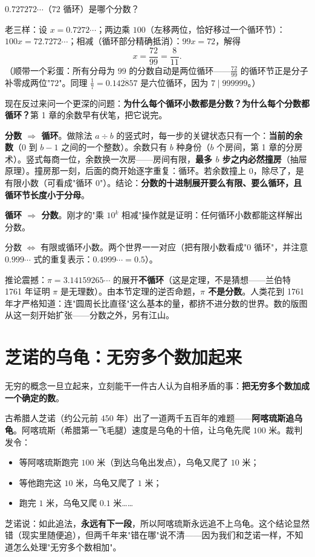 \begin{kaiwei}
$0.727272\cdots$（$72$ 循环）是哪个分数？
\end{kaiwei}

老三样：设 $x = 0.7272\cdots$；两边乘 $100$（左移两位，恰好移过一个循环节）：$100x = 72.7272\cdots$；相减（循环部分精确抵消）：$99x = 72$，解得
\[
x = \frac{72}{99} = \frac{8}{11} .
\]
（顺带一个彩蛋：所有分母为 $99$ 的分数自动是两位循环——$\tfrac{72}{99}$ 的循环节正是分子补零成两位"$72$"。同理 $\tfrac1{7} = 0.\overline{142857}$ 是六位循环，因为 $7 \mid 999999$。）

现在反过来问一个更深的问题：\textbf{为什么每个循环小数都是分数？为什么每个分数都循环？}第 1 章的余数早有伏笔，把它说完。

\textbf{分数 $\Rightarrow$ 循环}。做除法 $a\div b$ 的竖式时，每一步的关键状态只有一个：\textbf{当前的余数}（$0$ 到 $b-1$ 之间的一个整数）。余数只有 $b$ 种身份（$b$ 个房间，第 1 章的分房术）。竖式每商一位，余数换一次房——房间有限，\textbf{最多 $b$ 步之内必然撞房}（抽屉原理）。撞房那一刻，后面的商开始逐字重复：循环。若余数撞上 $0$，除尽了，是有限小数（可看成"循环 $0$"）。结论：\textbf{分数的十进制展开要么有限、要么循环，且循环节长度小于分母}。

\textbf{循环 $\Rightarrow$ 分数}。刚才的"乘 $10^k$ 相减"操作就是证明：任何循环小数都能这样解出分数。

\begin{dingli}
分数 $\iff$ 有限或循环小数。两个世界一一对应（把有限小数看成"$0$ 循环"，并注意 $0.999\cdots$ 式的重复表示：$0.4999\cdots = 0.5$）。
\end{dingli}

推论震撼：$\pi = 3.14159265\cdots$ 的展开\textbf{不循环}（这是定理，不是猜想——兰伯特 1761 年证明 $\pi$ 是无理数）。由本节定理的逆否命题，\textbf{$\pi$ 不是分数}。人类花到 1761 年才严格知道：连"圆周长比直径"这么基本的量，都挤不进分数的世界。数的版图从这一刻开始扩张——分数之外，另有江山。

\section{芝诺的乌龟：无穷多个数加起来}

无穷的概念一旦立起来，立刻能干一件古人认为自相矛盾的事：\textbf{把无穷多个数加成一个确定的数}。

古希腊人芝诺（约公元前 450 年）出了一道两千五百年的难题——\textbf{阿喀琉斯追乌龟}。阿喀琉斯（希腊第一飞毛腿）速度是乌龟的十倍，让乌龟先爬 $100$ 米。裁判发令：
\begin{itemize}
\item 等阿喀琉斯跑完 $100$ 米（到达乌龟出发点），乌龟又爬了 $10$ 米；
\item 等他跑完这 $10$ 米，乌龟又爬了 $1$ 米；
\item 跑完 $1$ 米，乌龟又爬 $0.1$ 米……
\end{itemize}
芝诺说：如此追法，\textbf{永远有下一段}，所以阿喀琉斯永远追不上乌龟。这个结论显然错（现实里随便追），但两千年来"错在哪"说不清——因为我们和芝诺一样，不知道怎么处理"无穷多个数相加"。

